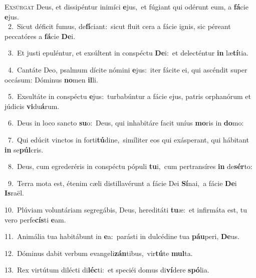 \lettrine{\initial\textcolor{\initialcolor}{E}}{xsúrgat} Deus, et dissipéntur inimíci \textbf{e}\-jus,~\star et fúgiant qui odérunt eum, a \textbf{fá}\-cie \textbf{e}\-jus.\\
{\numbfont\textcolor{\numbcolor}{~2.}}~Sicut déficit fumus, de\-\textbf{fí}\-ciant:~\star sicut fluit cera a fácie ignis, sic péreant peccatóres a \textbf{fá}\-cie \textbf{De}\-i.\par
{\numbfont\textcolor{\numbcolor}{~3.}}~Et justi epuléntur, et exsúltent in conspéctu \textbf{De}\-i:~\star et delecténtur \textbf{in} læ\-\textbf{tí}\-tia.\par
{\numbfont\textcolor{\numbcolor}{~4.}}~Cantáte Deo, psalmum dícite nómini \textbf{e}\-jus:~\star iter fácite ei, qui ascéndit super occásum: Dóminus \textbf{no}\-men \textbf{il}\-li.\par
{\numbfont\textcolor{\numbcolor}{~5.}}~Exsultáte in conspéctu \textbf{e}\-jus:~\star turbabúntur a fácie ejus, patris orphanórum et júdicis \textbf{vi}\-du\-\textbf{á}\-rum.\par
{\numbfont\textcolor{\numbcolor}{~6.}}~Deus in loco sancto \textbf{su}\-o:~\star Deus, qui inhabitáre facit uníus \textbf{mo}\-ris in \textbf{do}\-mo:\par
{\numbfont\textcolor{\numbcolor}{~7.}}~Qui edúcit vinctos in forti\-\textbf{tú}\-dine,~\star simíliter eos qui exásperant, qui hábitant \textbf{in} se\-\textbf{púl}\-cris.\par
{\numbfont\textcolor{\numbcolor}{~8.}}~Deus, cum egrederéris in conspéctu pópuli \textbf{tu}\-i,~\star cum pertransíres \textbf{in} de\-\textbf{sér}\-to:\par
{\numbfont\textcolor{\numbcolor}{~9.}}~Terra mota est, étenim cæli distillavérunt a fácie Dei \textbf{Sí}\-nai,~\star a fácie \textbf{De}\-i \textbf{Is}\-raël.\par
{\numbfont\textcolor{\numbcolor}{10.}}~Plúviam voluntáriam segregábis, Deus, hereditáti \textbf{tu}\-æ:~\star et infirmáta est, tu vero perfe\-\textbf{cís}\-ti \textbf{e}\-am.\par
{\numbfont\textcolor{\numbcolor}{11.}}~Animália tua habitábunt in \textbf{e}\-a:~\star parásti in dulcédine tua \textbf{páu}\-peri, \textbf{De}\-us.\par
{\numbfont\textcolor{\numbcolor}{12.}}~Dóminus dabit verbum evangeli\-\textbf{zán}\-tibus,~\star vir\-\textbf{tú}\-te \textbf{mul}\-ta.\par
{\numbfont\textcolor{\numbcolor}{13.}}~Rex virtútum dilécti di\-\textbf{léc}\-ti:~\star et speciéi domus di\-\textbf{ví}\-dere \textbf{spó}\-lia.\par
